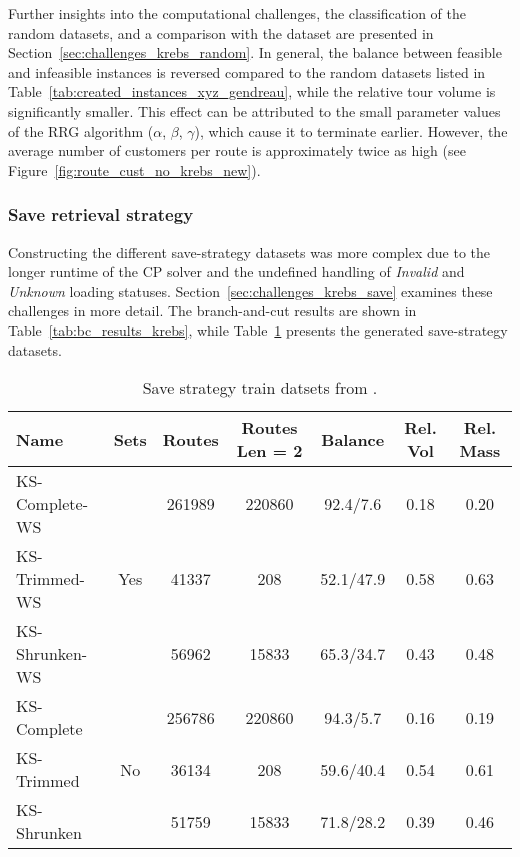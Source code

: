 Further insights into the computational challenges, the classification of the random datasets, and a comparison with the
\gendreauDataSetText dataset are presented in Section~\ref{sec:challenges_krebs_random}. In general, the balance between
feasible and infeasible instances is reversed compared to the random datasets listed in Table~\ref{tab:created_instances_xyz_gendreau},
while the relative tour volume is significantly smaller. This effect can be attributed to the small parameter values of the \gls{RRG}
algorithm ($\alpha$, $\beta$, $\gamma$), which cause it to terminate earlier. However, the average number of customers per route
is approximately twice as high (see Figure~\ref{fig:route_cust_no_krebs_new}).

\subsubsection{Save retrieval strategy}

Constructing the different save-strategy datasets was more complex due to the longer runtime of the \gls{CP} solver and the undefined
handling of \textit{Invalid} and \textit{Unknown} loading statuses. Section~\ref{sec:challenges_krebs_save} examines these
challenges in more detail. The branch-and-cut results are shown in Table~\ref{tab:bc_results_krebs}, while
Table~\ref{tab:saved_instances_krebs} presents the generated save-strategy datasets.

\begin{table}[ht]
    \centering
    \small
    \begin{tabular}{l c c c c c c }
        \toprule
        Name           & Sets                 & Routes & Routes Len = 2 & Balance   & Rel. Vol & Rel. Mass \\
        \midrule
        KS-Complete-WS & \multirow{3}{*}{Yes} & 261989 & 220860         & 92.4/7.6  & 0.18     & 0.20      \\
        KS-Trimmed-WS  &                      & 41337  & 208            & 52.1/47.9 & 0.58     & 0.63      \\
        KS-Shrunken-WS &                      & 56962  & 15833          & 65.3/34.7 & 0.43     & 0.48      \\        \midrule
        KS-Complete    & \multirow{3}{*}{No}  & 256786 & 220860         & 94.3/5.7  & 0.16     & 0.19      \\
        KS-Trimmed     &                      & 36134  & 208            & 59.6/40.4 & 0.54     & 0.61      \\
        KS-Shrunken    &                      & 51759  & 15833          & 71.8/28.2 & 0.39     & 0.46      \\

        \bottomrule
    \end{tabular}
    \caption{Save strategy train datsets from \krebsADataSet.}
    \label{tab:saved_instances_krebs}
\end{table}

